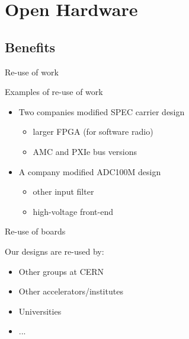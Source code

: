 \documentclass[compress,red]{beamer}
\begin{document}
\section{Open Hardware}

\subsection{Benefits}

\begin{frame}{Re-use of work}

  \begin{block}{Examples of re-use of work}
    \begin{itemize}
    \item Two companies modified SPEC carrier design
      \begin{itemize}
      \item larger FPGA (for software radio)
      \item AMC and PXIe bus versions
      \end{itemize}
    \item A company modified ADC100M design
      \begin{itemize}
      \item other input filter
      \item high-voltage front-end
      \end{itemize}
    \end{itemize}
  \end{block}

\end{frame}

\begin{frame}{Re-use of boards}

  \begin{block}{Our designs are re-used by:}
    \begin{itemize}
    \item Other groups at CERN
    \item Other accelerators/institutes
    \item Universities
    \item ...
    \end{itemize}
  \end{block}

\end{frame}
\end{document}
